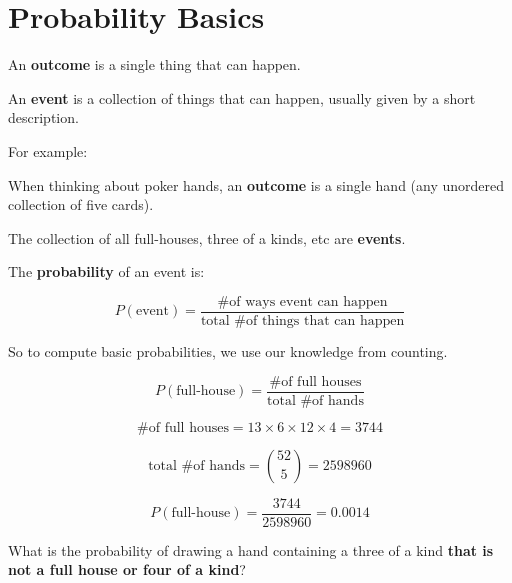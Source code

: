 \section{Probability Basics}

%
\begin{frame}

An \textbf{outcome} is a single thing that can happen.

\hfill

An \textbf{event} is a collection of things that can happen, usually given by a
short description.

\end{frame}
%

%
\begin{frame}

For example:

\hfill

When thinking about poker hands, an \textbf{outcome} is a single hand (any
unordered collection of five cards).

\hfill

The collection of all full-houses, three of a kinds, etc are \textbf{events}.

\end{frame}


%
\begin{frame}

The \textbf{probability} of an event is:

$$ P(\text{event}) = \frac{\text{\# of ways event can happen}}{\text{total \# of
things that can happen}} $$

So to compute basic probabilities, we use our knowledge from counting.

\end{frame}
%

%
\begin{frame}

$$ P(\text{full-house}) = \frac{\text{\# of full houses}}{\text{total \# of
hands}} $$

\end{frame}
%

%
\begin{frame}

$$ \text{\# of full houses} = 13 \times 6 \times 12 \times 4 = 3744 $$

$$ \text{total \# of hands} = {{52}\choose{5}} = 2598960 $$

\end{frame}
%

%
\begin{frame}

$$ P(\text{full-house}) = \frac{3744}{2598960} = 0.0014 $$

\end{frame}
%

%
\begin{frame}

What is the probability of drawing a hand containing a three of a kind \textbf{that is
not a full house or four of a kind}?


\end{frame}
